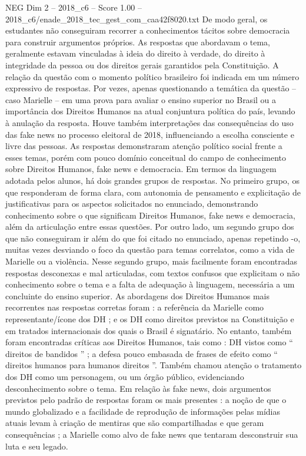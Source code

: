 \begin{textsample}{NEG Dim 2 – 2018\_c6 – Score 1.00 – 2018\_c6/enade\_2018\_tec\_gest\_com\_caa42f8020.txt}
De modo geral, os estudantes não conseguiram recorrer a conhecimentos tácitos sobre democracia para construir argumentos próprios.
As respostas que abordavam o tema, geralmente estavam vinculadas à ideia do direito à verdade, do direito à integridade da pessoa ou dos direitos gerais garantidos pela Constituição.
A relação da questão com o momento político brasileiro foi indicada em um número expressivo de respostas.
Por vezes, apenas questionando a temática da questão – caso Marielle – em uma prova para avaliar o ensino superior no Brasil ou a importância dos Direitos Humanos na atual conjuntura política do país, levando à anulação da resposta.
Houve também interpretações das consequências do uso das fake news no processo eleitoral de 2018, influenciando a escolha consciente e livre das pessoas.
As respostas demonstraram atenção político social frente a esses temas, porém com pouco domínio conceitual do campo de conhecimento sobre Direitos Humanos, fake news e democracia.
Em termos da linguagem adotada pelos alunos, há dois grandes grupos de respostas.
No primeiro grupo, os que responderam de forma clara, com autonomia de pensamento e explicitação de justificativas para os aspectos solicitados no enunciado, demonstrando conhecimento sobre o que significam Direitos Humanos, fake news e democracia, além da articulação entre essas questões.
Por outro lado, um segundo grupo dos que não conseguiram ir além do que foi citado no enunciado, apenas repetindo -o, muitas vezes desviando o foco da questão para temas correlatos, como a vida de Marielle ou a violência.
Nesse segundo grupo, mais facilmente foram encontradas respostas desconexas e mal articuladas, com textos confusos que explicitam o não conhecimento sobre o tema e a falta de adequação à linguagem, necessária a um concluinte do ensino superior.
As abordagens dos Direitos Humanos mais recorrentes nas respostas corretas foram : a referência da Marielle como representante/ícone dos DH ; e os DH como direitos previstos na Constituição e em tratados internacionais dos quais o Brasil é signatário.
No entanto, também foram encontradas críticas aos Direitos Humanos, tais como : DH vistos como “ direitos de bandidos ” ; a defesa pouco embasada de frases de efeito como “ direitos humanos para humanos direitos ”.
Também chamou atenção o tratamento dos DH como um personagem, ou um órgão público, evidenciando desconhecimento sobre o tema.
Em relação às fake news, dois argumentos previstos pelo padrão de respostas foram os mais presentes : a noção de que o mundo globalizado e a facilidade de reprodução de informações pelas mídias atuais levam à criação de mentiras que são compartilhadas e que geram consequências ; a Marielle como alvo de fake news que tentaram desconstruir sua luta e seu legado.

\end{textsample}
